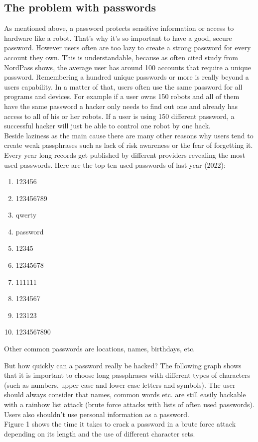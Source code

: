 \documentclass[conference]{IEEEtran}
\begin{document}
\subsection{The problem with passwords} 
As mentioned above, a password protects sensitive information or access to hardware like a robot. That's why it's so important to have a good, secure password. However users often are too lazy to create a strong password for every account they own. This is understandable, because as often cited study from NordPass shows, the average user has around 100 accounts that require a unique password. Remembering a hundred unique passwords or more is really beyond a users capability. In a matter of that, users often use the same password for all programs and devices. For example if a user owns 150 robots and all of them have the same password a hacker only needs to find out one and already has access to all of his or her robots. If a user is using 150 different password, a successful hacker will just be able to control one robot by one hack.\cite{b1} \cite{b2}\\
Beside laziness as the main cause there are many other reasons why users tend to create weak passphrases such as lack of risk awareness or the fear of forgetting it.\\
Every year long records get published by different providers revealing the most used passwords. Here are the top ten used passwords of last year (2022): \cite{b3}
\begin{enumerate}
\item 123456
\item 123456789
\item qwerty
\item password
\item 12345
\item 12345678
\item 111111
\item 1234567
\item 123123
\item 1234567890
\end{enumerate}
Other common passwords are locations, names, birthdays, etc.

But how quickly can a password really be hacked? The following graph shows that it is important to choose long passphrases with different types of characters (such as numbers, upper-case and lower-case letters and symbols). The user should always consider that names, common words etc. are still easily hackable with a rainbow list attack (brute force attacks with lists of often used passwords). Users also shouldn't use personal information as a password.\\
Figure 1 shows the time it takes to crack a password in a brute force attack depending on its length and the use of different character sets.
\end{document}
